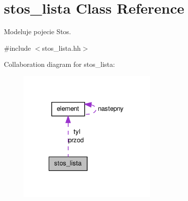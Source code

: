 \hypertarget{classstos__lista}{\section{stos\-\_\-lista Class Reference}
\label{classstos__lista}
}


Modeluje pojecie Stos.  




{\ttfamily \#include $<$stos\-\_\-lista.\-hh$>$}



Collaboration diagram for stos\-\_\-lista\-:\nopagebreak
\begin{figure}[H]
\begin{center}
\leavevmode
\includegraphics[width=195pt]{classstos__lista__coll__graph}
\end{center}
\end{figure}
